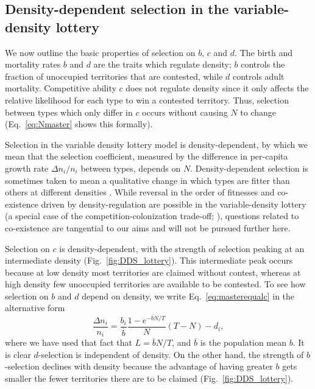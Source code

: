\documentclass[12pt]{article}
\begin{document}
\subsection*{Density-dependent selection in the variable-density lottery}

We now outline the basic properties of selection on $b$, $c$ and $d$. The birth and mortality rates $b$ and $d$ are the traits which regulate density; $b$ controls the fraction of unoccupied territories that are contested, while $d$ controls adult mortality. Competitive ability $c$ does not regulate density since it only affects the relative likelihood for each type to win a contested territory. Thus, selection between types which only differ in $c$ occurs without causing $N$ to change (Eq.~\eqref{eq:Nmaster} shows this formally). 

Selection in the variable density lottery model is density-dependent, by which we mean that  the selection coefficient, measured by the difference in per-capita growth rate $\Delta n_i/n_i$ between types, depends on $N$. Density-dependent selection is sometimes taken to mean a qualitative change in which types are fitter than others at different densities \citep{travis_2013}. While reversal in the order of fitnesses and co-existence driven by density-regulation are possible in the variable-density lottery (a special case of the competition-colonization trade-off; \citealt{levins_71,tilman_94,bolker_99}), questions related to co-existence are tangential to our aims and will not be pursued further here. 

Selection on $c$ is density-dependent, with the strength of selection  peaking at an intermediate density (Fig.~\ref{fig:DDS_lottery}). This intermediate peak occurs because at low density most territories are claimed without contest, whereas at high density few unoccupied territories are available to be contested. To see how selection on $b$ and $d$ depend on density, we write Eq.~\eqref{eq:masterequalc} in the alternative form
\begin{equation}
\frac{\Delta n_i}{n_i} = \frac{b_i}{\overline{b}}\frac{1-e^{-\overline{b}N/T}}{N}(T-N)-d_i, \label{eq:bdensitydependence}
\end{equation}
where we have used that fact that $L=\overline{b}N/T$, and $\overline{b}$ is the population mean $b$. It is clear $d$-selection is independent of density. On the other hand, the strength of $b$-selection declines with density because the advantage of having greater $b$ gets smaller the fewer territories there are to be claimed (Fig.~\ref{fig:DDS_lottery}). 
\end{document}
